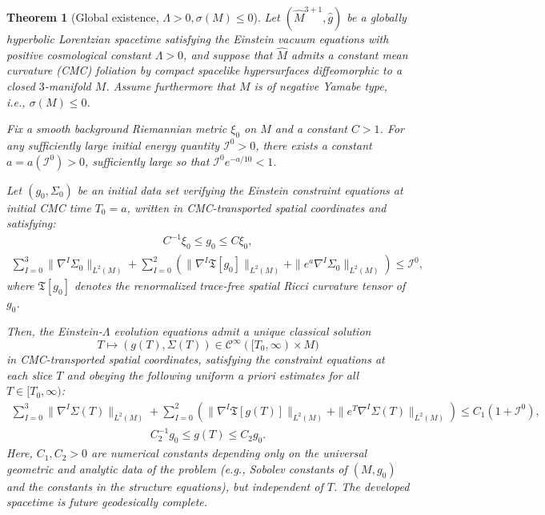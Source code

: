 \documentclass{amsart}
\newtheorem*{theorem-non}{Theorem}
\begin{document}
\begin{theorem-non} [Global existence, $\Lambda>0, \sigma(M)\leq 0$]
Let $(\widehat{M}^{3+1}, \widehat{g})$ be a globally hyperbolic Lorentzian spacetime satisfying the Einstein vacuum equations with positive cosmological constant $\Lambda > 0$, and suppose that $\widehat{M}$ admits a constant mean curvature (CMC) foliation by compact spacelike hypersurfaces diffeomorphic to a closed $3$-manifold $M$. Assume furthermore that $M$ is of negative Yamabe type, i.e., $\sigma(M) \leq 0$.

\noindent Fix a smooth background Riemannian metric $\xi_0$ on $M$ and a constant $C > 1$. For any sufficiently large initial energy quantity $\mathcal{I}^{0} > 0$, there exists a constant $a = a(\mathcal{I}^{0}) > 0$, sufficiently large so that $\mathcal{I}^{0} e^{-a/10} < 1$.

\noindent Let $(g_0, \Sigma_0)$ be an initial data set verifying the Einstein constraint equations at initial CMC time $T_0 = a$, written in CMC-transported spatial coordinates and satisfying:
\begin{align}
\label{eq:1}
C^{-1} \xi_0 \leq g_0 \leq C \xi_0,
\end{align}
\begin{align}
\label{eq:2}
\sum_{I = 0}^{3} \| \nabla^I \Sigma_0 \|_{L^2(M)} + \sum_{I = 0}^{2} \left( \| \nabla^I \mathfrak{T}[g_0] \|_{L^2(M)} + \| e^a \nabla^I \Sigma_0 \|_{L^2(M)} \right) \leq \mathcal{I}^0,
\end{align}
where $\mathfrak{T}[g_0]$ denotes the renormalized trace-free spatial Ricci curvature tensor of $g_0$.

\noindent Then, the Einstein-$\Lambda$ evolution equations admit a unique classical solution
\[
T \mapsto (g(T), \Sigma(T)) \in \mathcal{C}^\infty([T_0, \infty) \times M)
\]
in CMC-transported spatial coordinates, satisfying the constraint equations at each slice $T$ and obeying the following uniform a priori estimates for all $T \in [T_0, \infty)$:
\begin{align}
\sum_{I = 0}^{3} \| \nabla^I \Sigma(T) \|_{L^2(M)} + \sum_{I = 0}^{2} \left( \| \nabla^I \mathfrak{T}[g(T)] \|_{L^2(M)} + \| e^T \nabla^I \Sigma(T) \|_{L^2(M)} \right) \leq C_1(1 + \mathcal{I}^0),
\end{align}
\begin{align}
C_2^{-1} g_0 \leq g(T) \leq C_2 g_0.
\end{align}
Here, $C_1, C_2 > 0$ are numerical constants depending only on the universal geometric and analytic data of the problem (e.g., Sobolev constants of $(M, g_0)$ and the constants in the structure equations), but independent of $T$. The developed spacetime is future geodesically complete.


\end{theorem-non}
\end{document}
